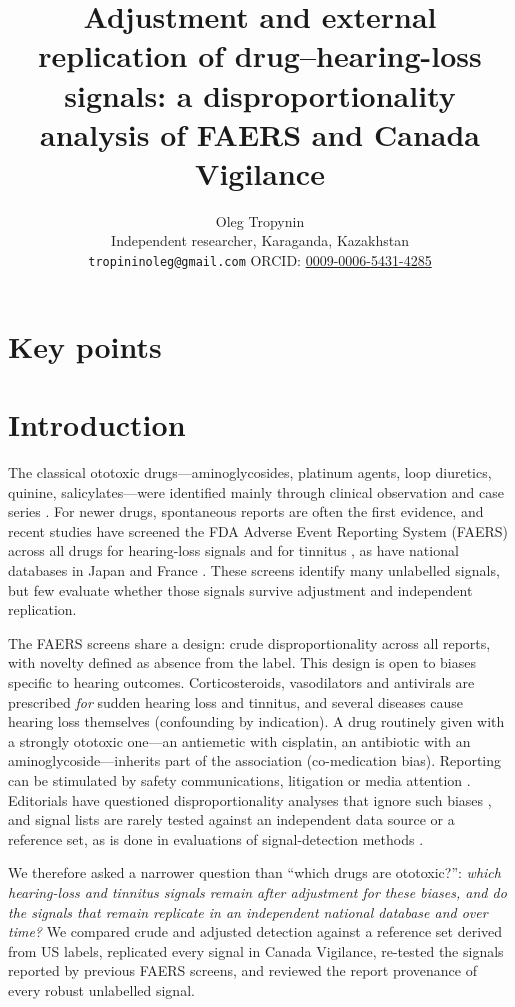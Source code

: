 \documentclass[11pt]{article}
\title{Adjustment and external replication of drug--hearing-loss signals:
a disproportionality analysis of FAERS and Canada Vigilance}
\author{Oleg Tropynin\\ \small Independent researcher, Karaganda, Kazakhstan\\ \small \texttt{tropininoleg@gmail.com}
\quad ORCID: \href{https://orcid.org/0009-0006-5431-4285}{0009-0006-5431-4285}}
\date{}
\begin{document}
\maketitle



\section*{Key points}


\section{Introduction}
The classical ototoxic drugs---aminoglycosides, platinum agents, loop diuretics, quinine, salicylates---were identified
mainly through clinical observation and case series \cite{lanvers2017}. For newer drugs, spontaneous reports are often the
first evidence, and recent studies have screened the FDA Adverse Event Reporting System (FAERS) across all drugs for
hearing-loss signals \cite{li2024,wu2025,liu2025} and for tinnitus \cite{narasimhaswamy2026,wang2024}, as have national
databases in Japan and France \cite{tanaka2019,favreliere2020}. These screens identify many unlabelled signals, but few
evaluate whether those signals survive adjustment and independent replication.

The FAERS screens share a design: crude disproportionality across all reports, with novelty defined as absence from the
label. This design is open to biases specific to hearing outcomes. Corticosteroids, vasodilators and antivirals are
prescribed \emph{for} sudden hearing loss and tinnitus, and several diseases cause hearing loss themselves (confounding by
indication). A drug routinely given with a strongly ototoxic one---an antiemetic with cisplatin, an antibiotic with an
aminoglycoside---inherits part of the association (co-medication bias). Reporting can be stimulated by safety
communications, litigation or media attention \cite{pariente2007}. Editorials have questioned disproportionality analyses
that ignore such biases \cite{ramessur2025}, and signal lists are rarely tested against an independent data source or a
reference set, as is done in evaluations of signal-detection methods \cite{harpaz2013}.

We therefore asked a narrower question than ``which drugs are ototoxic?'': \emph{which hearing-loss and tinnitus signals
remain after adjustment for these biases, and do the signals that remain replicate in an independent national database
and over time?} We compared crude and adjusted detection against a reference set derived from US labels, replicated every
signal in Canada Vigilance, re-tested the signals reported by previous FAERS screens, and reviewed the report provenance
of every robust unlabelled signal.
\end{document}
